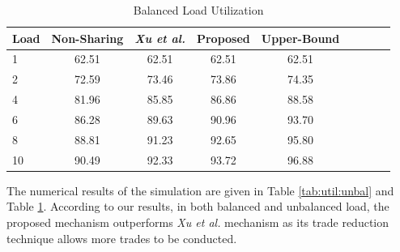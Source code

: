 \begin{table}%
   \caption{Balanced Load Utilization}
   \label{tab:util:bal}
   \small %
   \centering %
   \begin{tabular}{lcccccccr} %
   \toprule[\heavyrulewidth]\toprule[\heavyrulewidth]
       Load & Non-Sharing    & \textit{Xu et al.} & Proposed    & Upper-Bound \\ \hline
   \midrule
    1  & 62.51  & 62.51 & 62.51  & 62.51\\
    2  & 72.59  & 73.46 & 73.86  & 74.35\\
    4  & 81.96  & 85.85 & 86.86  & 88.58\\
    6  & 86.28  & 89.63 & 90.96  & 93.70\\
    8  & 88.81  & 91.23 & 92.65  & 95.80\\
    10 & 90.49  & 92.33 & 93.72  & 96.88\\
   \bottomrule[\heavyrulewidth]
   \end{tabular}
\end{table}

The numerical results of the simulation are given in Table \ref{tab:util:unbal} and Table \ref{tab:util:bal}. According to our results, in both balanced and unbalanced load, the proposed mechanism outperforms \textit{Xu et al.} mechanism as its trade reduction technique allows more trades to be conducted.




